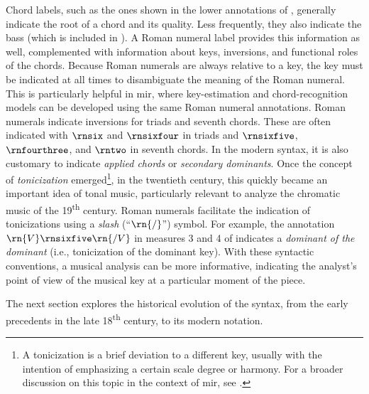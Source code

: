 

Chord labels, such as the ones shown in the lower
annotations of , generally indicate the root
of a chord and its quality. Less frequently, they also
indicate the bass (which is included in ). A
Roman numeral label provides this information as well,
complemented with information about keys, inversions, and
functional roles of the chords. Because Roman numerals are
always relative to a key, the key must be indicated at all
times to disambiguate the meaning of the Roman numeral. This
is particularly helpful in \gls{mir}, where key-estimation
and chord-recognition models can be developed using the same
Roman numeral annotations. Roman numerals indicate
inversions for triads and seventh chords. These are often
indicated with $\rnsix$ and $\rnsixfour$ in triads and
$\rnsixfive$, $\rnfourthree$, and $\rntwo$ in seventh
chords. In the modern syntax, it is also customary to
indicate \emph{applied chords} or \emph{secondary
dominants}. Once the concept of \emph{tonicization}
emerged\footnote{A tonicization is a brief deviation to a
different key, usually with the intention of emphasizing a
certain scale degree or harmony. For a broader discussion on
this topic in the context of \gls{mir}, see
\textcite{napoleslopez2020local}.}, in the twentieth
century, this quickly became an important idea of tonal
music, particularly relevant to analyze the chromatic music
of the 19\textsuperscript{th} century. Roman numerals
facilitate the indication of tonicizations using a
\emph{slash} (``$\rn{/}$'') symbol. For example, the
annotation $\rn{V}\rnsixfive\rn{/V}$ in measures 3 and 4 of
 indicates a \emph{dominant of the dominant}
(i.e., tonicization of the dominant key). With these
syntactic conventions, a musical analysis can be more
informative, indicating the analyst's point of view of the
musical key at a particular moment of the piece.

The next section explores the historical evolution of the
syntax, from the early precedents in the late
18\textsuperscript{th} century, to its modern notation.


